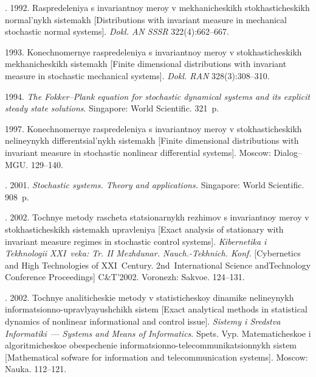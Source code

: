 \begin{multicols}{2}
{{\begin{thebibliography}{99}
. 1992.
Raspredeleniya s invariantnoy meroy v mekhanicheskikh sto\-kha\-sti\-che\-skikh
normal'nykh sistemakh [Distributions with invariant measure in mechanical
stochastic normal systems]. \textit{Dokl. AN SSSR} 322(4):662--667.

 1993.
 Konechnomernye raspredeleniya s invariantnoy meroy v stokhasticheskikh
 mekhanicheskikh sistemakh [Finite dimensional distributions with invariant
 measure in stochastic mechanical systems]. \textit{Dokl. RAN} 328(3):308--310.

  1994.
 \textit{The Fokker--Plank equation for stochastic dynamical systems and
 its explicit steady state solutions}. Singapore: World Scientific. 321~p.


 1997.
 Konechnomernye raspredeleniya s invariantnoy meroy v stokhasticheskikh
 nelineynykh differentsial'nykh sistemakh [Finite dimensional distributions
 with invariant measure in stochastic nonlinear differential systems].
 Moscow: Dialog--MGU. 129--140.

. 2001.
\textit{Stochastic systems. Theory and  applications.}
 Singapore: World Scientific. 908~p.


.  2002.
 Tochnye metody rascheta statsionarnykh rezhimov s invariantnoy
 meroy v stokhasticheskikh sistemakh upravleniya [Exact  analysis of
 stationary with invariant\linebreak
  measure regimes in stochastic control systems].
 \textit{Kibernetika i Tekhnologii XXI~veka: Tr. II Mezhdunar. Nauch.-Tekhnich.
 Konf.} [Cybernetics and High Technologies of XXI~Century.
2nd~International Science and\linebreak Technology Conference Proceedings] C\&T'2002.
 Voronezh: Sakvoe. 124--131.

.  2002.
{Tochnye analiticheskie metody v statisticheskoy dinamike
nelineynykh informatsionno-upravlyayushchikh sistem} [Exact analytical
methods in statistical dynamics of nonlinear informational and control issue].
\textit{Sistemy i Sredstva Informatiki}~---
\textit{Systems and Means of Informatics}. Spets. Vyp. Matematicheskoe i
algoritmicheskoe obespechenie informatsionno-telecommunikatsionnykh sistem
[Mathematical sofware for information and telecommunication systems].
Moscow: Nauka. 112--121.



\end{thebibliography}}}
\end{multicols}
